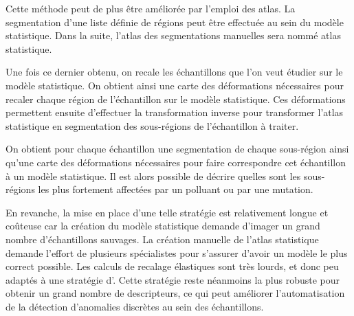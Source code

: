 \documentclass[\main/main.tex]{subfiles}
\begin{document}
%
Cette méthode peut de plus être améliorée par l'emploi des atlas. La segmentation d'une liste définie de régions peut être effectuée au sein du modèle statistique. Dans la suite, l'atlas des segmentations manuelles sera nommé atlas statistique.

Une fois ce dernier obtenu, on recale les échantillons que l'on veut étudier sur le modèle statistique. On obtient ainsi une carte des déformations nécessaires pour recaler chaque région de l'échantillon sur le modèle statistique. Ces déformations permettent ensuite d'effectuer la transformation inverse pour transformer l'atlas statistique en segmentation des sous-régions de l'échantillon à traiter.

On obtient pour chaque échantillon une segmentation de chaque sous-région ainsi qu'une carte des déformations nécessaires pour faire correspondre cet échantillon à un modèle statistique.
Il est alors possible de décrire quelles sont les sous-régions les plus fortement affectées par un polluant ou par une mutation.

En revanche, la mise en place d'une telle stratégie est relativement longue et coûteuse car la création du modèle statistique demande d'imager un grand nombre d'échantillons sauvages. La création manuelle de l'atlas statistique demande l'effort de plusieurs spécialistes pour s'assurer d'avoir un modèle le plus correct possible. Les calculs de recalage élastiques sont très lourds, et donc peu adaptés à une stratégie d'\hta. 
Cette stratégie reste néanmoins la plus robuste  pour obtenir un grand nombre de descripteurs, ce qui peut améliorer l'automatisation de la détection d'anomalies discrètes au sein des échantillons.
\end{document}
